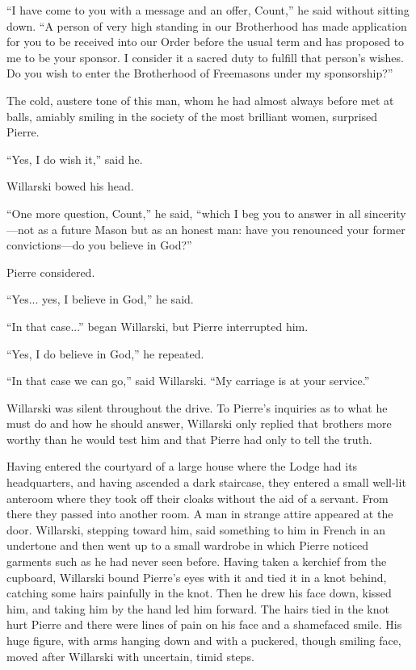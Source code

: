 ``I have come to you with a message and an offer, Count,'' he
said without sitting down. ``A person of very high standing in
our Brotherhood has made application for you to be received into
our Order before the usual term and has proposed to me to be your
sponsor. I consider it a sacred duty to fulfill that person's
wishes. Do you wish to enter the Brotherhood of Freemasons under
my sponsorship?''

The cold, austere tone of this man, whom he had almost always
before met at balls, amiably smiling in the society of the most
brilliant women, surprised Pierre.

``Yes, I do wish it,'' said he.

Willarski bowed his head.

``One more question, Count,'' he said, ``which I beg you to
answer in all sincerity---not as a future Mason but as an honest
man: have you renounced your former convictions---do you believe
in God?''

Pierre considered.

``Yes... yes, I believe in God,'' he said.

``In that case...'' began Willarski, but Pierre interrupted him.

``Yes, I do believe in God,'' he repeated.

``In that case we can go,'' said Willarski. ``My carriage is at
your service.''

Willarski was silent throughout the drive. To Pierre's inquiries
as to what he must do and how he should answer, Willarski only
replied that brothers more worthy than he would test him and that
Pierre had only to tell the truth.

Having entered the courtyard of a large house where the Lodge had
its headquarters, and having ascended a dark staircase, they
entered a small well-lit anteroom where they took off their
cloaks without the aid of a servant. From there they passed into
another room. A man in strange attire appeared at the
door. Willarski, stepping toward him, said something to him in
French in an undertone and then went up to a small wardrobe in
which Pierre noticed garments such as he had never seen
before. Having taken a kerchief from the cupboard, Willarski
bound Pierre's eyes with it and tied it in a knot behind,
catching some hairs painfully in the knot. Then he drew his face
down, kissed him, and taking him by the hand led him forward. The
hairs tied in the knot hurt Pierre and there were lines of pain
on his face and a shamefaced smile.  His huge figure, with arms
hanging down and with a puckered, though smiling face, moved
after Willarski with uncertain, timid steps.


